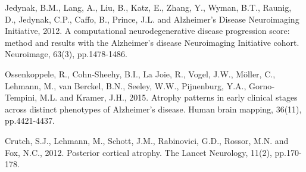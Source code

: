 \documentclass{llncs}
\begin{document}
\begin{thebibliography}{5}
Jedynak, B.M., Lang, A., Liu, B., Katz, E., Zhang, Y., Wyman, B.T., Raunig, D., Jedynak, C.P., Caffo, B., Prince, J.L. and Alzheimer's Disease Neuroimaging Initiative, 2012. A computational neurodegenerative disease progression score: method and results with the Alzheimer's disease Neuroimaging Initiative cohort. Neuroimage, 63(3), pp.1478-1486.

Ossenkoppele, R., Cohn‐Sheehy, B.I., La Joie, R., Vogel, J.W., Möller, C., Lehmann, M., van Berckel, B.N., Seeley, W.W., Pijnenburg, Y.A., Gorno‐Tempini, M.L. and Kramer, J.H., 2015. Atrophy patterns in early clinical stages across distinct phenotypes of Alzheimer's disease. Human brain mapping, 36(11), pp.4421-4437.

Crutch, S.J., Lehmann, M., Schott, J.M., Rabinovici, G.D., Rossor, M.N. and Fox, N.C., 2012. Posterior cortical atrophy. The Lancet Neurology, 11(2), pp.170-178.


\end{thebibliography}

\clearpage
\end{document}
